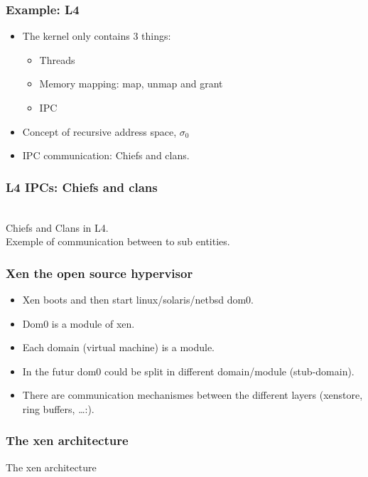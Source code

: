 \begin{frame}
  \frametitle{Example: L4}
  \begin{itemize}
        \item The kernel only contains 3 things:
        \begin{itemize}
                \item Threads
                \item Memory mapping: map, unmap and grant
                \item IPC
        \end{itemize}
        \item Concept of recursive address space, $\sigma{}_0$ 
        \item IPC communication: Chiefs and clans.
  \end{itemize}
\end{frame}
\begin{frame}
  \frametitle{L4 IPCs: Chiefs and clans}
  \begin{center}
   \\
  Chiefs and Clans in L4. \\ Exemple of communication between to sub
  entities.
  \end{center}
\end{frame}

\begin{frame}
        \frametitle{Xen the open source hypervisor}
        \begin{itemize}
                \item Xen boots and then start linux/solaris/netbsd dom0.
                \item Dom0 is a module of xen.
                \item Each domain (virtual machine) is a module.
                \item In the futur dom0 could be split in different
                domain/module (stub-domain).
                \item There are communication mechanismes between the
                different layers (xenstore, ring buffers, \ldots:).
        \end{itemize}
\end{frame}
\begin{frame}
\frametitle{The xen architecture}
\begin{center}


The xen architecture

\end{center}
\end{frame}

